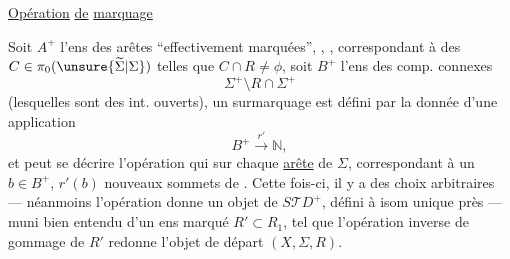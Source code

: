  
\uline{Opération} \uline{de}  \uline{marquage}

Soit $A^+$ l'ens des arêtes  ``effectivement marquées'', ,
,
correspondant à des $C\in\pi_0(\unsure{\widetilde\Sigma|\Sigma})$ telles que $C\cap R\ne\phi$, soit $B^+$ l'ens des comp. connexes 
\[
 \Sigma^+\setminus R\cap\Sigma^+
\]
(lesquelles sont des int. ouverts), un surmarquage est défini par la donnée d'une application
\[
 B^+\xrightarrow{r'}\mathbb N,
\]
et peut se décrire   l'opération qui sur chaque
\uline{arête} 
de $\Sigma$, correspondant à un $b\in B^+$, $r'(b)$ nouveaux sommets de  .
Cette fois-ci,  il y a des choix arbitraires --- néanmoins l'opération donne un objet  de $S\mathcal TD^+$, défini à isom unique près --- muni bien entendu d'un ens marqué $R'\subset R_1$, tel que l'opération inverse de gommage de $R'$ redonne l'objet de départ $(X,\Sigma,R)$.


